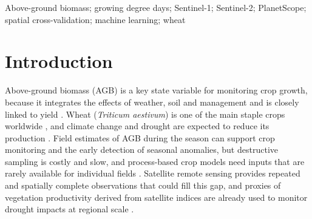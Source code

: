 \documentclass[
  british,
]{interact}
\begin{document}
\begin{keywords}
Above-ground biomass; growing degree days; Sentinel-1; Sentinel-2; PlanetScope; spatial cross-validation; machine learning; wheat
\end{keywords}


\section{Introduction}\label{introduction}

Above-ground biomass (AGB) is a key state variable for monitoring crop
growth, because it integrates the effects of weather, soil and
management and is closely linked to yield \citep{Dietz2021}. Wheat
(\emph{Triticum aestivum}) is one of the main staple crops worldwide
\citep{FAO2025}, and climate change and drought are expected to reduce
its production \citep{Pequeno2024, Santini2022}. Field estimates of AGB
during the season can support crop monitoring and the early detection of
seasonal anomalies, but destructive sampling is costly and slow, and
process-based crop models need inputs that are rarely available for
individual fields \citep{Lobell2010, Wang2023}. Satellite remote sensing
provides repeated and spatially complete observations that could fill
this gap, and proxies of vegetation productivity derived from satellite
indices are already used to monitor drought impacts at regional scale
\citep{Zambrano2016, Zambrano2018, Zambrano2021}.
\end{document}
